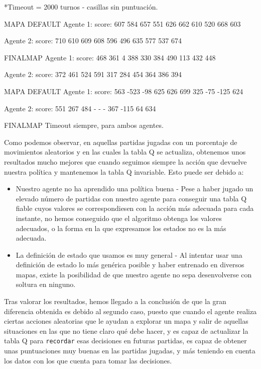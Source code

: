 \documentclass[12pt]{article}
\begin{document}
*Timeout = 2000 turnos - casillas sin puntuación.

MAPA DEFAULT
Agente 1:
score:	607		584		657		551		626		662		610		520		668		603

Agente 2:
score:	710		610		609		608		596		496		635		577		537		674

FINALMAP
Agente 1:
score:	468		361		4		388		330		384		490		113		432		448

Agente 2:
score:	372		461		524		591		317		284		454		364		386		394

MAPA DEFAULT
Agente 1:
score:	563		-523	-98		625		626		699		325		-75		-125	624

Agente 2:
score:	551		267		484		-		-		-		367		-115	64		634

FINALMAP
Timeout siempre, para ambos agentes.

Como podemos observar, en aquellas partidas jugadas con un porcentaje de movimientos aleatorios y en las cuales la tabla Q se actualiza, obtenemos unos resultados mucho mejores que cuando seguimos siempre la acción que devuelve nuestra política y mantenemos la tabla Q invariable. Esto puede ser debido a:

\begin{itemize}
	\item Nuestro agente no ha aprendido una política buena - Pese a haber jugado un elevado número de partidas con nuestro agente para conseguir una tabla Q fiable cuyos valores se correspondiesen con la acción más adecuada para cada instante, no hemos conseguido que el algoritmo obtenga los valores adecuados, o la forma en la que expresamos los estados no es la más adecuada.
	\item La definición de estado que usamos es muy general - Al intentar usar una definición de estado lo más genérica posible y haber entrenado en diversos mapas, existe la posibilidad de que nuestro agente no sepa desenvolverse con soltura en ninguno.
\end{itemize}

Tras valorar los resultados, hemos llegado a la conclusión de que la gran diferencia obtenida es debido al segundo caso, puesto que cuando el agente realiza ciertas acciones aleatorias que le ayudan a explorar un mapa y salir de aquellas situaciones en las que no tiene claro qué debe hacer, y es capaz de actualizar la tabla Q para \texttt{recordar} esas decisiones en futuras partidas, es capaz de obtener unas puntuaciones muy buenas en las partidas jugadas, y más teniendo en cuenta los datos con los que cuenta para tomar las decisiones.
\end{document}
